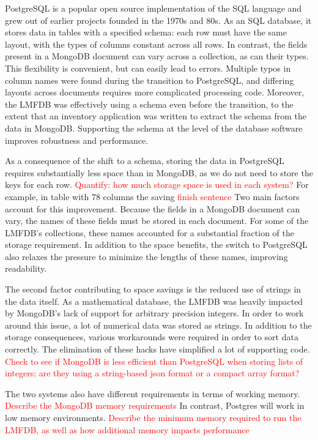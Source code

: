 \documentclass{article}
\newcommand{\todo}[1]{\textcolor{red}{#1}}
\begin{document}
PostgreSQL is a popular open source implementation of the SQL language and grew out of earlier projects founded in the 1970s and 80s.
As an SQL database, it stores data in tables with a specified schema: each row must have the same layout, with the types of columns constant across all rows.
In contrast, the fields present in a MongoDB document can vary across a collection, as can their types.
This flexibility is convenient, but can easily lead to errors.
Multiple typos in column names were found during the transition to PostgreSQL, and differing layouts across documents requires more complicated processing code.
Moreover, the LMFDB was effectively using a schema even before the transition, to the extent that an inventory application was written to extract the schema from the data in MongoDB.
Supporting the schema at the level of the database software improves robustness and performance.

As a consequence of the shift to a schema, storing the data in PostgreSQL requires substantially less space than in MongoDB, as we do not need to store the keys for each row.
\todo{Quantify: how much storage space is used in each system?}
For example, in table with 78 columns the saving  \todo{finish sentence}
Two main factors account for this improvement.
Because the fields in a MongoDB document can vary, the names of these fields must be stored in each document.
For some of the LMFDB's collections, these names accounted for a substantial fraction of the storage requirement.
In addition to the space benefits, the switch to PostgreSQL also relaxes the pressure to minimize the lengths of these names, improving readability.

The second factor contributing to space savings is the reduced use of strings in the data itself.
As a mathematical database, the LMFDB was heavily impacted by MongoDB's lack of support for arbitrary precision integers.
In order to work around this issue, a lot of numerical data was stored as strings.
In addition to the storage consequences, various workarounds were required in order to sort data correctly.
The elimination of these hacks have simplified a lot of supporting code.
\todo{Check to see if MongoDB is less efficient than PostgreSQL when storing lists of integers; are they using a string-based json format or a compact array format?}

The two systems also have different requirements in terms of working memory.
\todo{Describe the MongoDB memory requirements}
In contrast, Postgres will work in low memory environments.
\todo{Describe the minimum memory required to run the LMFDB, as well as how additional memory impacts performance}
\end{document}
